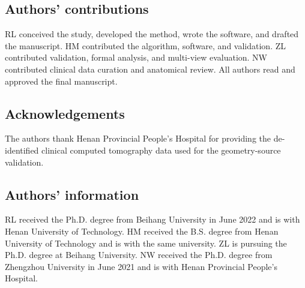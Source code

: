 \documentclass[pdflatex,lineno,referee,sn-vancouver,Numbered]{sn-jnl}
\begin{document}
\subsection*{Authors' contributions}
RL conceived the study, developed the method, wrote the software, and drafted the manuscript. HM contributed the algorithm, software, and validation. ZL contributed validation, formal analysis, and multi-view evaluation. NW contributed clinical data curation and anatomical review. All authors read and approved the final manuscript.

\subsection*{Acknowledgements}
The authors thank Henan Provincial People's Hospital for providing the de-identified clinical computed tomography data used for the geometry-source validation.

\subsection*{Authors' information}
RL received the Ph.D. degree from Beihang University in June 2022 and is with Henan University of Technology. HM received the B.S. degree from Henan University of Technology and is with the same university. ZL is pursuing the Ph.D. degree at Beihang University. NW received the Ph.D. degree from Zhengzhou University in June 2021 and is with Henan Provincial People's Hospital.


\end{document}
